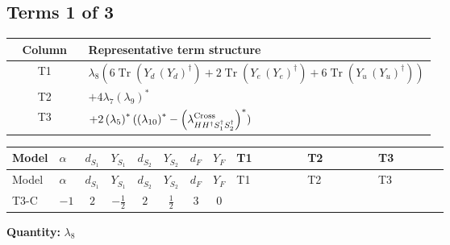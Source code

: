 \documentclass[8pt]{article}
\begin{document}
\begin{landscape}
\subsection*{Terms 1 of 3}
\begin{center}
\begin{tabular}{@{}c >{\raggedright\arraybackslash}p{0.82\linewidth}@{}}
\toprule
Column & Representative term structure \\
\midrule
T1 & \(\displaystyle {\lambda_{8}} (6 \operatorname{Tr}\!\left({Y_d}\,\left({Y_d}\right)^{\dagger}\right)+2 \operatorname{Tr}\!\left({Y_e}\,\left({Y_e}\right)^{\dagger}\right)+6 \operatorname{Tr}\!\left({Y_u}\,\left({Y_u}\right)^{\dagger}\right))\) \\
\midrule
T2 & \(\displaystyle +4 {\lambda_{7}} \left({\lambda_{9}}\right)^{*}\) \\
\midrule
T3 & \(\displaystyle +2 \left({\lambda_5}\right)^{*} (\left({\lambda_{10}}\right)^{*}-\left({\lambda_{H H^\dagger S_1^\dagger S_2^\dagger}^{\rm Cross}}\right)^{*})\) \\
\midrule
\bottomrule
\end{tabular}
\end{center}
\smallskip
\tiny
\begin{longtable}{@{}llcccccc >{\raggedright\arraybackslash}p{0.21\linewidth} >{\raggedright\arraybackslash}p{0.21\linewidth} >{\raggedright\arraybackslash}p{0.21\linewidth}@{}}
\toprule
Model & $\alpha$ & $d_{S_1}$ & $Y_{S_1}$ & $d_{S_2}$ & $Y_{S_2}$ & $d_F$ & $Y_F$ & T1 & T2 & T3 \\
\midrule
\endfirsthead
\toprule
Model & $\alpha$ & $d_{S_1}$ & $Y_{S_1}$ & $d_{S_2}$ & $Y_{S_2}$ & $d_F$ & $Y_F$ & T1 & T2 & T3 \\
\midrule
\endhead
T3-C & $-1$ & $2$ & $-\frac{1}{2}$ & $2$ & $\frac{1}{2}$ & $3$ & $0$ & \scriptsize\adjustbox{max width=\linewidth}{$\begin{gathered} {\lambda_{8}} (6 \operatorname{Tr}\!\left({Y_d}\,\left({Y_d}\right)^{\dagger}\right)+2 \operatorname{Tr}\!\left({Y_e}\,\left({Y_e}\right)^{\dagger}\right)+6 \operatorname{Tr}\!\left({Y_u}\,\left({Y_u}\right)^{\dagger}\right))\end{gathered}$} & \scriptsize\adjustbox{max width=\linewidth}{$\begin{gathered} +4 {\lambda_{7}} \left({\lambda_{9}}\right)^{*}\end{gathered}$} & \scriptsize\adjustbox{max width=\linewidth}{$\begin{gathered} +2 \left({\lambda_5}\right)^{*} (\left({\lambda_{10}}\right)^{*}-\left({\lambda_{H H^\dagger S_1^\dagger S_2^\dagger}^{\rm Cross}}\right)^{*})\end{gathered}$} \\
\midrule
\bottomrule
\end{longtable}
\clearpage
\noindent\textbf{Quantity: }$\lambda_{8}$\par\smallskip

\end{landscape}
\end{document}
